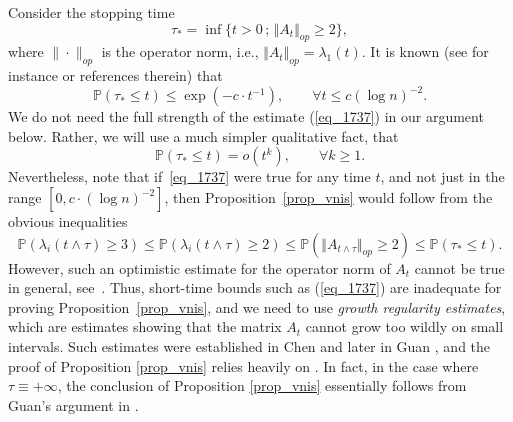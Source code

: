 \documentclass[12pt,a4paper]{article}
\newcommand{\prob}{\mathbb{P}}
\theoremstyle{definition}
\begin{document}
Consider the stopping time 
\begin{equation}\label{eq_deftaustar}
\tau_* = \inf \{ t > 0 \, ; \,  \Vert A_t \Vert_{op} \geq 2 \} ,
\end{equation}
where $\| \cdot \|_{op}$ is the operator norm, i.e., $\Vert A_t \Vert_{op} = \lambda_1 (t)$.
It is known (see for instance \cite[Section 7]{KLbull} or references therein) that
\begin{equation}
\label{eq_1737}
\prob ( \tau_* \leq t ) \leq \exp (- c\cdot t^{-1} ) ,
\qquad \forall t \leq c(\log n)^{-2}.
\end{equation}
We do not need the full strength of the estimate (\ref{eq_1737}) in our argument below. Rather,
we will use a much simpler qualitative fact, that 
\begin{equation}\label{eq_1738}
\prob ( \tau_* \leq t ) = o (t^k) , \qquad \forall k \geq 1. 
\end{equation}
Nevertheless, note that if~\eqref{eq_1737} were  true
for any time $t$, and not just in the range $[0,c \cdot (\log n)^{-2}]$,
then Proposition~\ref{prop_vnis} would follow
from the obvious inequalities
\[
\prob ( \lambda_i (t \wedge \tau ) \geq 3 ) \leq
\prob ( \lambda_i (t \wedge \tau ) \geq 2 )
\leq \prob ( \Vert A_{t\wedge \tau} \Vert_{op} \geq 2 )
\leq \prob ( \tau_* \leq t ) .
\]
However, such an optimistic estimate
for the operator norm of $A_t$ cannot be true in general,
see~\cite[section 8.1]{KLbull}.  Thus, short-time bounds such as (\ref{eq_1737}) are inadequate 
for proving Proposition~\ref{prop_vnis}, 
and we need to use {\it growth regularity estimates}, which are estimates showing that the matrix $A_t$ cannot grow too wildly on small intervals. 
Such estimates were established in Chen \cite{chen} and later in Guan \cite{guan}, and 
the proof of Proposition \ref{prop_vnis} 
relies heavily on \cite{guan}. In fact, in the case where $\tau \equiv +\infty$, the conclusion of Proposition \ref{prop_vnis} 
essentially follows from Guan's argument in \cite{guan}.
\end{document}
